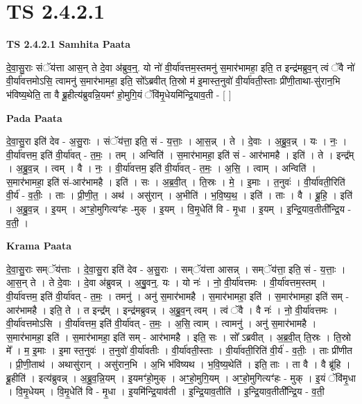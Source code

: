\documentclass[17pt]{extarticle}
\begin{document}
\section*{ TS 2.4.2.1 }

\textbf{TS 2.4.2.1 } \newline
\textbf{Samhita Paata} \newline

दे॒वा॒सु॒राः संॅय॑त्ता आस॒न् ते दे॒वा अ॑ब्रुव॒न्॒. यो नो॑ वी॒र्या॑वत्तम॒स्तमनु॑ स॒मार॑भामहा॒ इति॒ त इन्द्र॑मब्रुव॒न् त्वं ॅवै नो॑ वी॒र्या॑वत्तमोऽसि॒ त्वामनु॑ स॒मार॑भामहा॒ इति॒ सो᳚ऽब्रवीत् ति॒स्रो म॑ इ॒मास्त॒नुवो॑ वी॒र्या॑वती॒स्ताः प्री॑णी॒ताथा-सु॑रान॒भि भ॑विष्य॒थेति॒ ता वै ब्रू॒हीत्य॑ब्रुवन्नि॒यमꣳ॑ हो॒मुगि॒यं ॅवि॑मृ॒धेयमि॑न्द्रि॒याव॒ती - [  ] \newline

\textbf{Pada Paata} \newline

दे॒वा॒सु॒रा इति॑ देव - अ॒सु॒राः । संॅय॑त्ता॒ इति॒ सं - य॒त्ताः॒ । आ॒स॒न्न् । ते । दे॒वाः । अ॒ब्रु॒व॒न्न् । यः । नः॒ । वी॒र्या॑वत्तम॒ इति॑ वी॒र्या॑वत् - त॒मः॒ । तम् । अन्विति॑ । स॒मार॑भामहा॒ इति॑ सं - आर॑भामहै । इति॑ । ते । इन्द्र᳚म् । अ॒ब्रु॒व॒न्न् । त्वम् । वै । नः॒ । वी॒र्या॑वत्तम॒ इति॑ वी॒र्या॑वत् - त॒मः॒ । अ॒सि॒ । त्वाम् । अन्विति॑ । स॒मार॑भामहा॒ इति॑ सं-आर॑भामहै । इति॑ । सः । अ॒ब्र॒वी॒त् । ति॒स्रः । मे॒ । इ॒माः । त॒नुवः॑ । वी॒र्या॑वती॒रिति॑ वी॒र्य॑ - व॒तीः॒ । ताः । प्री॒णी॒त॒ । अथ॑ । असु॑रान् । अ॒भीति॑ । भ॒वि॒ष्य॒थ॒ । इति॑ । ताः । वै । ब्रू॒हि॒ । इति॑ । अ॒ब्रु॒व॒न्न् । इ॒यम् । अꣳ॒॒हो॒मुगित्यꣳ॑हः -मुक् । इ॒यम् । वि॒मृ॒धेति॑ वि - मृ॒धा । इ॒यम् । इ॒न्द्रि॒याव॒तीती᳚न्द्रि॒य - व॒ती॒ ।  \newline


\textbf{Krama Paata} \newline

दे॒वा॒सु॒राः सम्ॅय॑त्ताः । दे॒वा॒सु॒रा इति॑ देव - अ॒सु॒राः । सम्ॅय॑त्ता आसन्न् । सम्ॅय॑त्ता॒ इति॒ सं - य॒त्ताः॒ । आ॒स॒न् ते । 
ते दे॒वाः । दे॒वा अ॑ब्रुवन्न् । अ॒बु॒॒वन्॒. यः । यो नः॑ । नो॒ वी॒र्या॑वत्तमः । वी॒र्या॑वत्तम॒स्तम् । वी॒र्या॑वत्तम॒ इति॑ वी॒र्या॑वत् - त॒मः॒ । तमनु॑ । अनु॑ स॒मार॑भामहै । स॒मार॑भामहा॒ इति॑ । स॒मार॑भामहा॒ इति॑ सम् - आर॑भामहै । इति॒ ते । त इन्द्र᳚म् । इन्द्र॑मब्रुवन्न् । अ॒ब्रु॒व॒न् त्वम् । त्वं ॅवै । वै नः॑ । नो॒ वी॒र्या॑वत्तमः । वी॒र्या॑वत्तमोऽसि । वी॒र्या॑वत्तम॒ इति॑ वी॒र्या॑वत् - त॒मः॒ । अ॒सि॒ त्वाम् । त्वामनु॑ । अनु॑ स॒मार॑भामहै । स॒मार॑भामहा॒ इति॑ । स॒मार॑भामहा॒ इति॑ सम् - आर॑भामहै । इति॒ सः । सो᳚ ऽब्रवीत् । अ॒ब्र॒वी॒त् ति॒स्रः । ति॒स्रो मे᳚ । म॒ इ॒माः । इ॒मा स्त॒नुवः॑ । त॒नुवो॑ वी॒र्या॑वतीः । वी॒र्या॑वती॒स्ताः । वी॒र्या॑वती॒रिति॑ वी॒र्य॑ - व॒तीः॒ । ताः प्री॑णीत । प्री॒णी॒ताथ॑ । अथासु॑रान् । असु॑रान॒भि । अ॒भि भ॑विष्यथ । भ॒वि॒ष्य॒थेति॑ । इति॒ ताः । ता वै । वै ब्रू॑हि । ब्रू॒हीति॑ । इत्य॑ब्रुवन्न् । अ॒ब्रु॒व॒न्नि॒यम् । इ॒यमꣳ॑हो॒मुक् । अꣳ॒॒हो॒मुगि॒यम् । अꣳ॒॒हो॒मुगित्यꣳ॑हः - मुक् । इ॒यं ॅवि॑मृ॒धा । वि॒मृ॒धेयम् । वि॒मृ॒धेति॑ वि - मृ॒धा । इ॒यमि॑न्द्रि॒याव॑ती । इ॒न्द्रि॒याव॒तीति॑ । इ॒न्द्रि॒याव॒तीती᳚न्द्रि॒य - व॒ती॒ \newline
\end{document}

